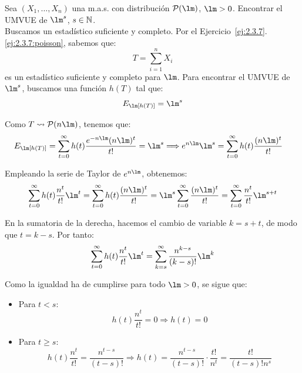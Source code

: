 \begin{ejercicio}\label{ej:UMVUE-Poisson}
    Sea $(X_1, \ldots, X_n)$ una m.a.s. con distribución $\cc{P}(\lm)$, $\lm > 0$. Encontrar el UMVUE de $\lm^s$, $s \in \mathbb{N}$.\\
    
    Buscamos un estadístico suficiente y completo. Por el Ejercicio~\ref{ej:2.3.7}.\ref{ej:2.3.7:poisson}, sabemos que:
    \begin{equation*}
        T = \sum_{i=1}^{n} X_i
    \end{equation*}
    es un estadístico suficiente y completo para $\lm$. Para encontrar el UMVUE de $\lm^s$, buscamos una función $h(T)$ tal que:
    \begin{equation*}
        E_\lm[h(T)] = \lm^s
    \end{equation*}

    Como $T\rightsquigarrow \cc{P}(n\lm)$, tenemos que:
    \begin{align*}
        E_\lm[h(T)] &= \sum_{t=0}^{\infty} h(t) \dfrac{e^{-n\lm}(n\lm)^t}{t!} = \lm^s
        \Longrightarrow
        e^{n\lm} \lm^s = \sum_{t=0}^{\infty} h(t) \dfrac{(n\lm)^t}{t!}
    \end{align*}

    Empleando la serie de Taylor de $e^{n\lm}$, obtenemos:
    \begin{align*}
        \sum_{t=0}^{\infty} h(t) \dfrac{n^t}{t!}\lm^t
        = \sum_{t=0}^{\infty} h(t) \dfrac{(n\lm)^t}{t!}
        = \lm^s \sum_{t=0}^{\infty} \dfrac{(n\lm)^t}{t!}
        = \sum_{t=0}^{\infty} \dfrac{n^t}{t!} \lm^{s+t}
    \end{align*}

    En la sumatoria de la derecha, hacemos el cambio de variable $k = s + t$, de modo que $t = k - s$. Por tanto:
    \begin{align*}
        \sum_{t=0}^{\infty} h(t) \dfrac{n^t}{t!}\lm^t
        = \sum_{k=s}^{\infty} \dfrac{n^{k-s}}{(k-s)!} \lm^k
    \end{align*}

    Como la igualdad ha de cumplirse para todo $\lm > 0$, se sigue que:
    \begin{itemize}
        \item Para $t < s$:
        \begin{equation*}
            h(t) \frac{n^t}{t!} = 0 \Longrightarrow h(t) = 0
        \end{equation*}
        \item Para $t \geq s$:
        \begin{equation*}
            h(t) \frac{n^t}{t!} = \frac{n^{t-s}}{(t-s)!} \Longrightarrow h(t) = \frac{n^{t-s}}{(t-s)!} \cdot \frac{t!}{n^t} = \frac{t!}{(t-s)! n^s}
        \end{equation*}
    \end{itemize}


\end{ejercicio}

